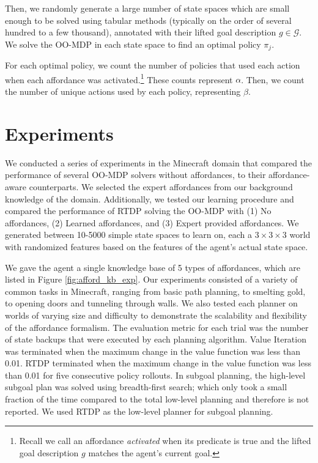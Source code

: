 \documentclass[conference]{IEEEtran}
\begin{document}
Then, we randomly generate a large number of state spaces which are small 
enough to be solved using tabular methods (typically on the order of several hundred to a few thousand), 
annotated with their lifted goal description $g \in \mathcal{G}$. We solve the 
OO-MDP in each state space to find an optimal policy $\pi_j$.

For each optimal policy, we count the number of policies that used each action 
when each affordance was activated.\footnote{Recall we call an affordance {\it activated} 
when its predicate is true and the lifted goal description $g$ matches the agent's current goal.} 
These counts represent $\alpha$. Then, we count the number of unique actions used by each policy, representing $\beta$. 

\section{Experiments}
\label{sec:experiments}

We conducted a series of experiments in the Minecraft domain that
compared the performance of several OO-MDP solvers without affordances,
to their affordance-aware counterparts. We selected the expert
affordances from our background knowledge of the domain. Additionally, we
tested our learning procedure and compared the performance of RTDP solving the OO-MDP
with (1) No affordances, (2) Learned affordances, and (3) Expert provided affordances. We generated between 10-5000 simple state
spaces to learn on, each a $3\times3\times3$ world with randomized features based on the features of the agent's actual state space.

We gave the agent a single knowledge base of 5 types of affordances,
which are listed in Figure \ref{fig:afford_kb_exp}.  Our experiments
consisted of a variety of common tasks in Minecraft, ranging from
basic path planning, to smelting gold, to opening doors and tunneling
through walls.  We also tested each planner on worlds of varying size
and difficulty to demonstrate the scalability and flexibility of the
affordance formalism. The evaluation metric for each trial was the
number of state backups that were executed by each planning
algorithm. Value Iteration was terminated when the maximum change in
the value function was less than 0.01. RTDP terminated when the
maximum change in the value function was less than 0.01 for five
consecutive policy rollouts. In subgoal planning, the high-level
subgoal plan was solved using breadth-first search; which only took a
small fraction of the time compared to the total low-level planning
and therefore is not reported.  We used RTDP as the low-level planner
for subgoal planning.
\end{document}
